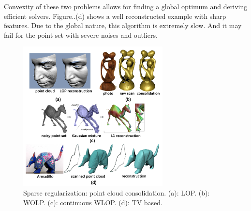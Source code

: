 Convexity of these two problems allows for finding a global optimum and deriving efficient solvers. Figure..(d) shows a well reconstructed example with sharp features. Due to the global nature, this algorithm is extremely slow. And it may fail for the point set with severe noises and outliers.

\begin{figure}[ht]
  \centering
  \includegraphics[width=3in]{images/reconstruction_L1}
  \caption{Sparse regularization: point cloud consolidation. (a): LOP\cite{lipman2007parameterization}. (b): WOLP\cite{huang2009consolidation}. (c): continuous WLOP\cite{preiner2014CPF}. (d): TV based\cite{avron2010L1}.}
\end{figure}


